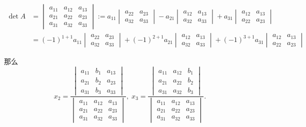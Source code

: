 \documentclass[10pt,openany]{article}
\theoremstyle{thmstyle} %
\theoremstyle{defstyle} %
\theoremstyle{prostyle} %
\theoremstyle{exastyle}
\theoremstyle{remstyle}
\begin{document}
\begin{align*}
	\det A &=\begin{vmatrix}
		a_{11} & a_{12} & a_{13} \\
		a_{21} & a_{22} & a_{23} \\
		a_{31} & a_{32} & a_{33} 
	\end{vmatrix}:=a_{11} \begin{vmatrix}
		a_{22} & a_{23} \\
		a_{32} & a_{33}
	\end{vmatrix}
	- a_{21} \begin{vmatrix}
		a_{12} & a_{13} \\
		a_{32} & a_{33} 
	\end{vmatrix}
	+ a_{31} \begin{vmatrix}
		a_{12} & a_{13} \\
		a_{22} & a_{23} 
	\end{vmatrix} \\
	&= (-1)^{1+1}a_{11} \begin{vmatrix}
		a_{22} & a_{23} \\
		a_{32} & a_{33}
	\end{vmatrix}
	+(-1)^{2+1} a_{21} \begin{vmatrix}
		a_{12} & a_{13} \\
		a_{32} & a_{33} 
	\end{vmatrix}
	+(-1)^{3+1}a_{31} \begin{vmatrix}
		a_{12} & a_{13} \\
		a_{22} & a_{23} 
	\end{vmatrix}
\end{align*}


那么
\[ x_2= \frac{\begin{vmatrix}
		a_{11} & b_1 & a_{13} \\
		a_{21} & b_2 & a_{23} \\
		a_{31} & b_3 & a_{33} 
\end{vmatrix}}{\begin{vmatrix}
		a_{11} & a_{12} & a_{13} \\
		a_{21} & a_{22} & a_{23} \\
		a_{31} & a_{32} & a_{33} 
\end{vmatrix}}, \; x_3=\frac{\begin{vmatrix}
a_{11} & a_{12} & b_1 \\
a_{21} & a_{22} & b_2 \\
a_{31} & a_{32} & b_3 
\end{vmatrix}}{\begin{vmatrix}
a_{11} & a_{12} & a_{13} \\
a_{21} & a_{22} & a_{23} \\
a_{31} & a_{32} & a_{33} 
\end{vmatrix}}. \]
\end{document}
